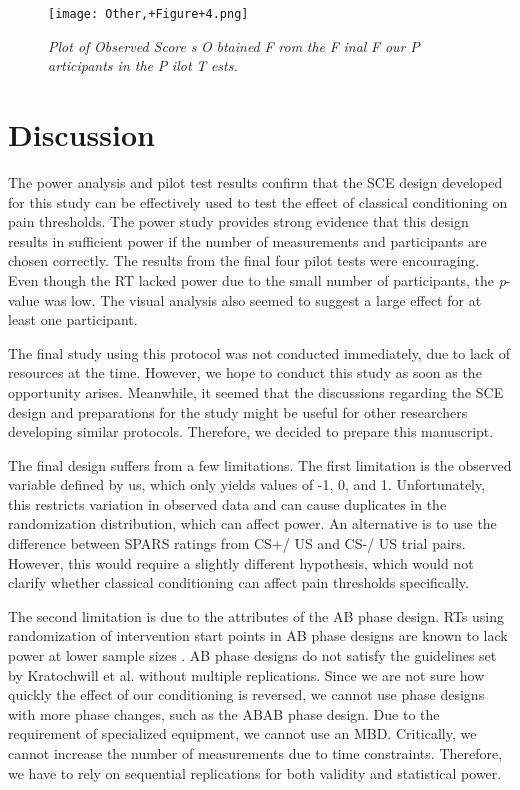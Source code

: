 \documentclass{article}
\begin{document}
  \begin{figure}

  \texttt{[image: Other,+Figure+4.png]}
\caption{\emph{Plot of }\emph{Observed Score} \emph{s }\emph{O} \emph{btained }\emph{F} \emph{rom} \emph{the }\emph{F} \emph{inal }\emph{F} \emph{our }\emph{P} \emph{articipants in the }\emph{P} \emph{ilot }\emph{T} \emph{ests.} }
\label{Figure 4}
 

\end{figure}
\section{Discussion} 

The power analysis and pilot test results confirm that the SCE design developed for this study can be effectively used to test the effect of classical conditioning on pain thresholds. The power study provides strong evidence that this design results in sufficient power if the number of measurements and participants are chosen correctly. The results from the final four pilot tests were encouraging. Even though the RT lacked power due to the small number of participants, the \emph{p}-value was low. The visual analysis also seemed to suggest a large effect for at least one participant. 

The final study using this protocol was not conducted immediately, due to lack of resources at the time. However, we hope to conduct this study as soon as the opportunity arises. Meanwhile, it seemed that the discussions regarding the SCE design and preparations for the study might be useful for other researchers developing similar protocols. Therefore, we decided to prepare this manuscript.

The final design suffers from a few limitations. The first limitation is the observed variable defined by us, which only yields values of -1, 0, and 1. Unfortunately, this restricts variation in observed data and can cause duplicates in the randomization distribution, which can affect power. An alternative is to use the difference between SPARS ratings from CS+/ US and CS-/ US trial pairs. However, this would require a slightly different hypothesis, which would not clarify whether classical conditioning can affect pain thresholds specifically.

The second limitation is due to the attributes of the AB phase design. RTs using randomization of intervention start points in AB phase designs are known to lack power at lower sample sizes \autocite{bib46}. AB phase designs do not satisfy the guidelines set by Kratochwill et al. \autocite{bib26} without multiple replications. Since we are not sure how quickly the effect of our conditioning is reversed, we cannot use phase designs with more phase changes, such as the ABAB phase design. Due to the requirement of specialized equipment, we cannot use an MBD. Critically, we cannot increase the number of measurements due to time constraints. Therefore, we have to rely on sequential replications for both validity and statistical power. 
\end{document}
